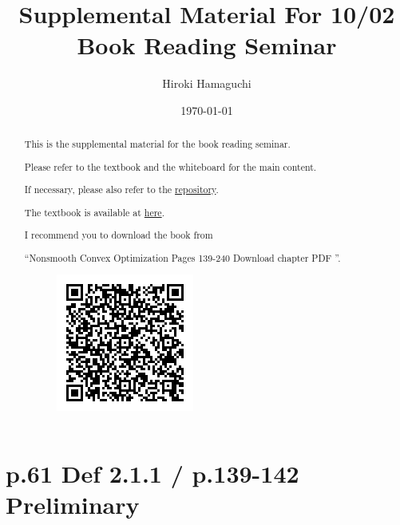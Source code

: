 \documentclass[a4paper, 14pt, dvipdfmx]{extarticle}
\begin{document}
\title{Supplemental Material For 10/02\\Book Reading Seminar}
\author{Hiroki Hamaguchi}
\date{\today}
\maketitle

\begin{abstract}
    \begin{center}
        This is the supplemental material for the book reading seminar.

        Please refer to the textbook and the whiteboard for the main content.

        If necessary, please also refer to the \href{https://github.com/hari64boli64/BookReadingSeminarMaterials}{repository}.

        The textbook is available at \href{https://link-springer-com.utokyo.idm.oclc.org/book/10.1007/978-3-319-91578-4}{here}.

        I recommend you to download the book from

        ``Nonsmooth Convex Optimization Pages 139-240 Download chapter PDF ''.

        \begin{figure}[htbp]
            \centering
            \includegraphics[width=0.2\columnwidth]{../BookQR.png}
        \end{figure}

    \end{center}
\end{abstract}

\section*{p.61 Def 2.1.1 / p.139-142 Preliminary}
\end{document}
